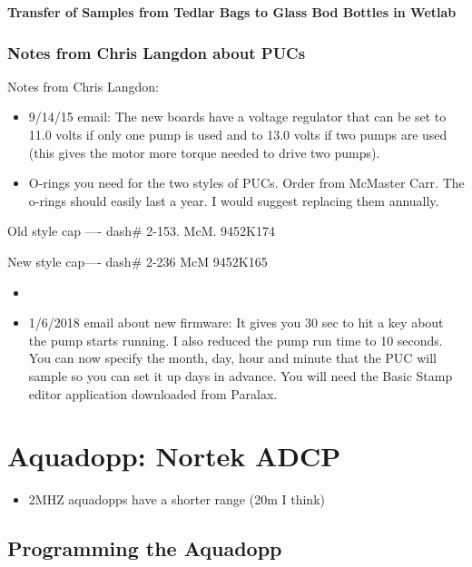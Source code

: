 \documentclass[]{book}
\providecommand{\tightlist}{%
  \setlength{\itemsep}{0pt}\setlength{\parskip}{0pt}}
\begin{document}
\textbf{Transfer of Samples from Tedlar Bags to Glass Bod Bottles in Wetlab}

\hypertarget{notes-from-chris-langdon-about-pucs}{%
\subsection{Notes from Chris Langdon about PUCs}\label{notes-from-chris-langdon-about-pucs}}

Notes from Chris Langdon:

\begin{itemize}
\tightlist
\item
  9/14/15 email: The new boards have a voltage regulator that can be set to 11.0 volts if only one pump is used and to 13.0 volts if two pumps are used (this gives the motor more torque needed to drive two pumps).
\item
  O-rings you need for the two styles of PUCs. Order from McMaster Carr. The o-rings should easily last a year. I would suggest replacing them annually.
\end{itemize}

Old style cap ---- dash\# 2-153. McM. 9452K174

New style cap---- dash\# 2-236 McM 9452K165

\begin{itemize}
\item
\item
  1/6/2018 email about new firmware: It gives you 30 sec to hit a key about the pump starts running. I also reduced the pump run time to 10 seconds. You can now specify the month, day, hour and minute that the PUC will sample so you can set it up days in advance. You will need the Basic Stamp editor application downloaded from Paralax.
\end{itemize}

\hypertarget{aquadopp-nortek-adcp}{%
\chapter{Aquadopp: Nortek ADCP}\label{aquadopp-nortek-adcp}}

\begin{itemize}
\tightlist
\item
  2MHZ aquadopps have a shorter range (20m I think)
\end{itemize}

\hypertarget{programming-the-aquadopp}{%
\section{Programming the Aquadopp}\label{programming-the-aquadopp}}
\end{document}
